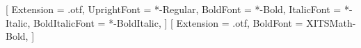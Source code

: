 

\usepackage{gensymb}

\usepackage{fdsymbol}

\usepackage{mathtools}

\usepackage{sectsty}
\sectionfont{\Large\bfseries}
\subsectionfont{\large\bfseries}

\usepackage{fontspec}
\usepackage{unicode-math}

\setmainfont{XITS}
[    Extension = .otf,
   UprightFont = *-Regular,
      BoldFont = *-Bold,
    ItalicFont = *-Italic,
BoldItalicFont = *-BoldItalic,
]
[    Extension = .otf,
      BoldFont = XITSMath-Bold,
]

\renewcommand{\thesection}{5.\arabic{section}}

\usepackage[font=small,labelfont=bf,labelsep=period]{caption}

\usepackage{float}

\newcommand{\E}{\textnormal{E}}

